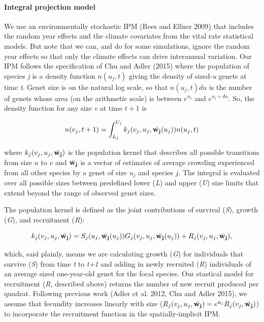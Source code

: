 \documentclass[12pt,]{article}
\begin{document}
\paragraph{Integral projection model}\label{integral-projection-model}

We use an environmentally stochastic IPM (Rees and Ellner 2009) that
includes the random year effects and the climate covariates from the
vital rate statistical models. But note that we can, and do for some
simulations, ignore the random year effects so that only the climate
effects can drive interannual variation. Our IPM follows the
specification of Chu and Adler (2015) where the population of species
\emph{j} is a density function $n(u_{j},t)$ giving the density of
sized-\emph{u} genets at time \emph{t}. Genet size is on the natural log
scale, so that $n(u_{j},t)du$ is the number of genets whose area (on the
arithmetic scale) is between $e^{u_{j}}$ and $e^{u_{j}+du}$. So, the
density function for any size \emph{v} at time $t+1$ is

\begin{equation}
n(v_{j},t+1) = \int_{L_{j}}^{U_{j}} k_{j}(v_{j},u_{j},\bar{\bold{w_{j}}}(u_{j}))n(u_{j},t)
\end{equation}

where $k_{j}(v_{j},u_{j},\bar{\bold{w_{j}}})$ is the population kernel
that describes all possible transitions from size $u$ to $v$ and
$\bar{\bold{w_{j}}}$ is a vector of estimates of average crowding
experienced from all other species by a genet of size $u_j$ and species
$j$. The integral is evaluated over all possible sizes between
predefined lower (\emph{L}) and upper (\emph{U}) size limits that extend
beyond the range of observed genet sizes.

The population kernel is defined as the joint contributions of survival
(\emph{S}), growth (\emph{G}), and recruitment (\emph{R}):

\begin{equation}
k_{j}(v_{j},u_{j},\bar{\bold{w_{j}}}) = S_j(u_j, \bar{\bold{w_{j}}}(u_{j}))G_j(v_{j},u_{j},\bar{\bold{w_{j}}}(u_{j})) + R_j(v_{j},u_{j},\bar{\bold{w_{j}}}),
\end{equation}

which, said plainly, means we are calculating growth (\emph{G}) for
individuals that survive (\emph{S}) from time \emph{t} to \emph{t+1} and
adding in newly recruited (\emph{R}) individuals of an average sized
one-year-old genet for the focal species. Our stastical model for
recruitment (\emph{R}, described above) returns the number of new
recruit produced per quadrat. Following previous work (Adler et al.
2012, Chu and Adler 2015), we assume that fecundity increases linearly
with size
($R_j(v_{j},u_{j},\bar{\bold{w_{j}}}) = e^{u_j}R_j(v_{j},\bar{\bold{w_{j}}})$)
to incorporate the recruitment function in the spatially-implicit IPM.
\end{document}
